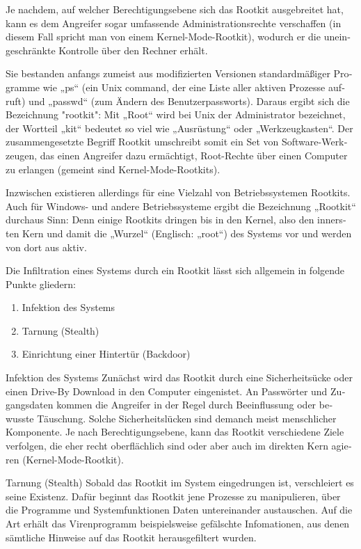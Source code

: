 \begin{otherlanguage}{ngerman}
    Je nachdem, auf welcher Berechtigungsebene sich das Rootkit ausgebreitet hat, kann es dem Angreifer sogar umfassende Administrationsrechte verschaffen (in diesem Fall spricht man von einem Kernel-Mode-Rootkit), wodurch er die uneingeschränkte Kontrolle über den Rechner erhält.
    
    Sie bestanden anfangs zumeist aus modifizierten Versionen standardmäßiger Programme wie „ps“ (ein Unix command, der eine Liste aller aktiven Prozesse aufruft) und „passwd“ (zum Ändern des Benutzerpassworts). Daraus ergibt sich die Bezeichnung "rootkit": Mit „Root“ wird bei Unix der Administrator bezeichnet, der Wortteil „kit“ bedeutet so viel wie „Ausrüstung“ oder „Werkzeugkasten“. Der zusammengesetzte Begriff Rootkit umschreibt somit ein Set von Software-Werkzeugen, das einen Angreifer dazu ermächtigt, Root-Rechte über einen Computer zu erlangen (gemeint sind Kernel-Mode-Rootkits).

    Inzwischen existieren allerdings für eine Vielzahl von Betriebssystemen Rootkits. Auch für Windows- und andere Betriebssysteme ergibt die Bezeichnung „Rootkit“ durchaus Sinn: Denn einige Rootkits dringen bis in den Kernel, also den innersten Kern und damit die „Wurzel“ (Englisch: „root“) des Systems vor und werden von dort aus aktiv.
    
    Die Infiltration eines Systems durch ein Rootkit lässt sich allgemein in folgende Punkte gliedern:
    \begin{enumerate}
        \item Infektion des Systems
        \item Tarnung (Stealth)
        \item Einrichtung einer Hintertür (Backdoor)
    \end{enumerate}
    
    Infektion des Systems
    \newline Zunächst wird das Rootkit durch eine Sicherheitsücke oder einen Drive-By Download in den Computer eingenistet. An Passwörter und Zugangsdaten kommen die Angreifer in der Regel durch Beeinflussung oder bewusste Täuschung. Solche Sicherheitslücken sind demanch meist menschlicher Komponente. Je nach Berechtigungsebene, kann das Rootkit verschiedene Ziele verfolgen, die eher recht oberflächlich sind oder aber auch im direkten Kern agieren (Kernel-Mode-Rootkit).
    
    Tarnung (Stealth)
    \newline Sobald das Rootkit im System eingedrungen ist, verschleiert es seine Existenz. Dafür beginnt das Rootkit jene Prozesse zu manipulieren, über die Programme und Systemfunktionen Daten untereinander austauschen. Auf die Art erhält das Virenprogramm beispielsweise gefälschte Infomationen, aus denen sämtliche Hinweise auf das Rootkit herausgefiltert wurden.
    

\end{otherlanguage}
